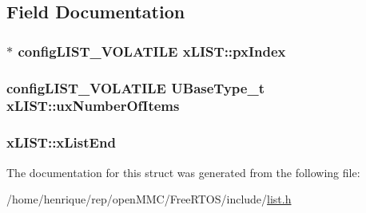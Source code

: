 \subsection{Field Documentation}
\hypertarget{structxLIST_a7bf64d87701493b4c8c5c977682500d7}{
\subsubsection[{px\-Index}]{$\ast$ {\bf config\-L\-I\-S\-T\-\_\-\-V\-O\-L\-A\-T\-I\-L\-E} x\-L\-I\-S\-T\-::px\-Index}}\label{structxLIST_a7bf64d87701493b4c8c5c977682500d7}
\hypertarget{structxLIST_aa5cb7cdc699e1252af0441e46e427a03}{
\subsubsection[{ux\-Number\-Of\-Items}]{ {\bf config\-L\-I\-S\-T\-\_\-\-V\-O\-L\-A\-T\-I\-L\-E} {\bf U\-Base\-Type\-\_\-t} x\-L\-I\-S\-T\-::ux\-Number\-Of\-Items}}\label{structxLIST_aa5cb7cdc699e1252af0441e46e427a03}
\hypertarget{structxLIST_a49ad62fa153126e27e273811167b336a}{
\subsubsection[{x\-List\-End}]{ x\-L\-I\-S\-T\-::x\-List\-End}}\label{structxLIST_a49ad62fa153126e27e273811167b336a}


The documentation for this struct was generated from the following file\-:\begin{DoxyCompactItemize}
\item 
/home/henrique/rep/open\-M\-M\-C/\-Free\-R\-T\-O\-S/include/\hyperlink{list_8h}{list.\-h}\end{DoxyCompactItemize}
